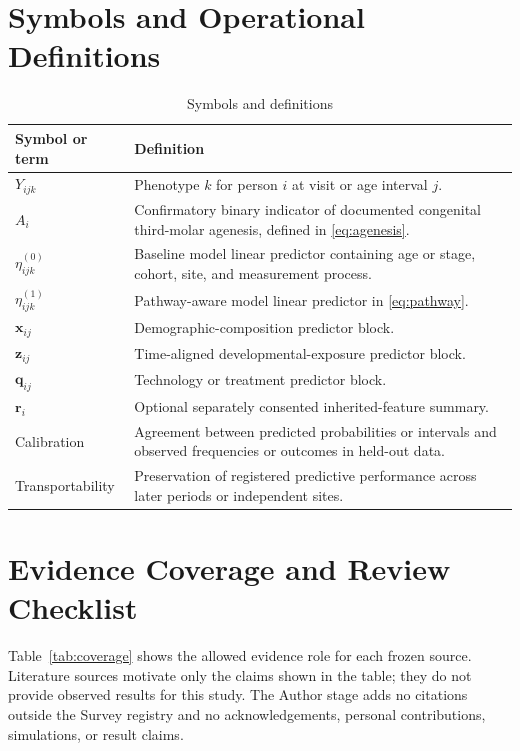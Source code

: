 \documentclass[conference]{IEEEtran}
\begin{document}
\section{Symbols and Operational Definitions}

\begin{table}[h]
\caption{Symbols and definitions}
\label{tab:symbols}
\centering
\footnotesize
\begin{tabular}{p{}p{}}
\toprule
Symbol or term & Definition \\
\midrule
$Y_{ijk}$ & Phenotype $k$ for person $i$ at visit or age interval $j$. \\
$A_i$ & Confirmatory binary indicator of documented congenital third-molar agenesis, defined in \eqref{eq:agenesis}. \\
$\eta^{(0)}_{ijk}$ & Baseline model linear predictor containing age or stage, cohort, site, and measurement process. \\
$\eta^{(1)}_{ijk}$ & Pathway-aware model linear predictor in \eqref{eq:pathway}. \\
$\boldsymbol{x}_{ij}$ & Demographic-composition predictor block. \\
$\boldsymbol{z}_{ij}$ & Time-aligned developmental-exposure predictor block. \\
$\boldsymbol{q}_{ij}$ & Technology or treatment predictor block. \\
$\boldsymbol{r}_{i}$ & Optional separately consented inherited-feature summary. \\
Calibration & Agreement between predicted probabilities or intervals and observed frequencies or outcomes in held-out data. \\
Transportability & Preservation of registered predictive performance across later periods or independent sites. \\
\bottomrule
\end{tabular}
\end{table}

\section{Evidence Coverage and Review Checklist}

Table~\ref{tab:coverage} shows the allowed evidence role for each frozen
source. Literature sources motivate only the claims shown in the table; they
do not provide observed results for this study. The Author stage adds no
citations outside the Survey registry and no acknowledgements, personal
contributions, simulations, or result claims.
\end{document}
